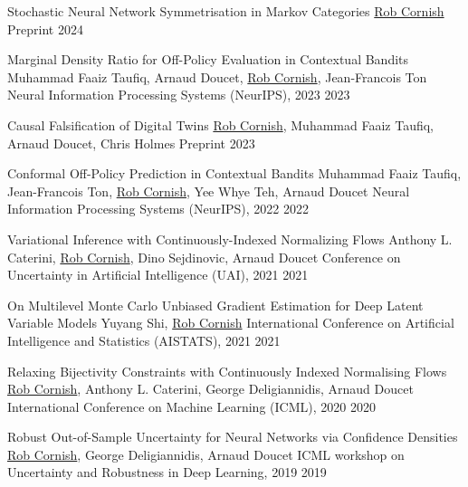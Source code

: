 \documentclass[9pt]{developercv} %
\begin{document}
\begin{entrylist}
    \publication
        {Stochastic Neural Network Symmetrisation in Markov Categories}
        {\underline{Rob Cornish}}
        {Preprint}
        {2024}

    \publication
        {Marginal Density Ratio for Off-Policy Evaluation in Contextual Bandits}
        {Muhammad Faaiz Taufiq, Arnaud Doucet, \underline{Rob Cornish}, Jean-Francois Ton}
        {Neural Information Processing Systems (NeurIPS), 2023}
        {2023}

    \publication
        {Causal Falsification of Digital Twins}
        {\underline{Rob Cornish}, Muhammad Faaiz Taufiq, Arnaud Doucet, Chris Holmes}
        {Preprint}
        {2023}

    \publication
        {Conformal Off-Policy Prediction in Contextual Bandits}
        {Muhammad Faaiz Taufiq, Jean-Francois Ton, \underline{Rob Cornish}, Yee Whye Teh, Arnaud Doucet}
        {Neural Information Processing Systems (NeurIPS), 2022}
        {2022}

    \publication
        {Variational Inference with Continuously-Indexed Normalizing Flows}
        {Anthony L. Caterini, \underline{Rob Cornish}, Dino Sejdinovic, Arnaud Doucet}
        {Conference on Uncertainty in Artificial Intelligence (UAI), 2021}
        {2021}

    \publication
        {On Multilevel Monte Carlo Unbiased Gradient Estimation for Deep Latent Variable Models}
        {Yuyang Shi, \underline{Rob Cornish}}
        {International Conference on Artificial Intelligence and Statistics (AISTATS), 2021}
        {2021}


    \publication
        {Relaxing Bijectivity Constraints with Continuously Indexed Normalising Flows}
        {\underline{Rob Cornish}, Anthony L. Caterini, George Deligiannidis, Arnaud Doucet}
        {International Conference on Machine Learning (ICML), 2020}
        {2020}

    \publication
        {Robust Out-of-Sample Uncertainty for Neural Networks via Confidence Densities}
        {\underline{Rob Cornish}, George Deligiannidis, Arnaud Doucet}
        {ICML workshop on Uncertainty and Robustness in Deep Learning, 2019}
        {2019}


\end{entrylist}
\end{document}
